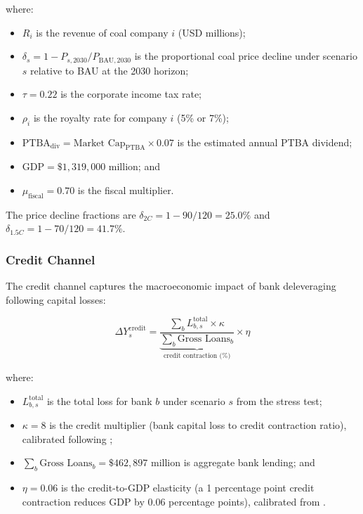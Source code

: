 \noindent where:
\begin{itemize}
    \item $R_i$ is the revenue of coal company $i$ (USD millions);
    \item $\delta_s = 1 - P_{s,2030} / P_{\text{BAU},2030}$ is the proportional coal price decline under scenario $s$ relative to BAU at the 2030 horizon;
    \item $\tau = 0.22$ is the corporate income tax rate;
    \item $\rho_i$ is the royalty rate for company $i$ (5\% or 7\%);
    \item $\text{PTBA}_{\text{div}} = \text{Market Cap}_{\text{PTBA}} \times 0.07$ is the estimated annual PTBA dividend;
    \item $\text{GDP} = \$1{,}319{,}000$ million; and
    \item $\mu_{\text{fiscal}} = 0.70$ is the fiscal multiplier.
\end{itemize}

The price decline fractions are $\delta_{2C} = 1 - 90/120 = 25.0\%$ and $\delta_{1.5C} = 1 - 70/120 = 41.7\%$.


\subsubsection{Credit Channel}

The credit channel captures the macroeconomic impact of bank deleveraging following capital losses:

\begin{equation}
\label{eq:app_credit}
\Delta Y^{\text{credit}}_s = \underbrace{\frac{\sum_b L_{b,s}^{\text{total}} \times \kappa}{\sum_b \text{Gross Loans}_b}}_{\text{credit contraction (\%)}} \times \eta
\end{equation}

\noindent where:
\begin{itemize}
    \item $L_{b,s}^{\text{total}}$ is the total loss for bank $b$ under scenario $s$ from the stress test;
    \item $\kappa = 8$ is the credit multiplier (bank capital loss to credit contraction ratio), calibrated following \citet{GambacortaMarques2011};
    \item $\sum_b \text{Gross Loans}_b = \$462{,}897$ million is aggregate bank lending; and
    \item $\eta = 0.06$ is the credit-to-GDP elasticity (a 1 percentage point credit contraction reduces GDP by 0.06 percentage points), calibrated from \citet{PeekRosengren2000}.
\end{itemize}


